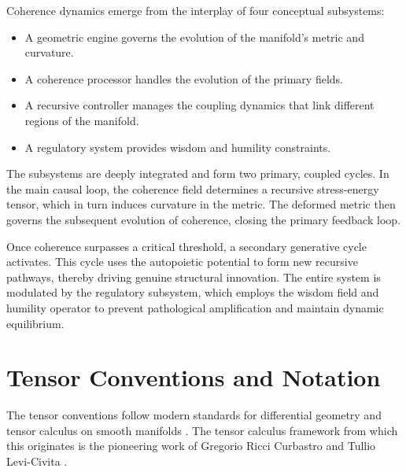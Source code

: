 Coherence dynamics emerge from the interplay of four conceptual subsystems:

\begin{itemize}

    \item A geometric engine governs the evolution of the manifold's metric and curvature.

    \item A coherence processor handles the evolution of the primary fields.

    \item A recursive controller manages the coupling dynamics that link different regions of the manifold.

    \item A regulatory system provides wisdom and humility constraints.

\end{itemize}

The subsystems are deeply integrated and form two primary, coupled cycles. In the main causal loop, the coherence field determines a recursive stress-energy tensor, which in turn induces curvature in the metric. The deformed metric then governs the subsequent evolution of coherence, closing the primary feedback loop. 

Once coherence surpasses a critical threshold, a secondary generative cycle activates. This cycle uses the autopoietic potential to form new recursive pathways, thereby driving genuine structural innovation. The entire system is modulated by the regulatory subsystem, which employs the wisdom field and humility operator to prevent pathological amplification and maintain dynamic equilibrium.


\section{Tensor Conventions and Notation}
\label{sec:tensor_conventions_and_notation}

The tensor conventions follow modern standards for differential geometry and tensor calculus on smooth manifolds \autocite{Lee2003, MisnerThorneWheeler1973}. The tensor calculus framework from which this originates is the pioneering work of Gregorio Ricci Curbastro and Tullio Levi-Civita \autocite{RicciLeviCivita1901}.


